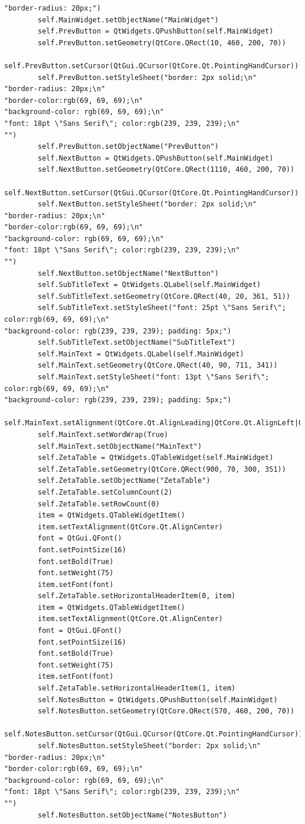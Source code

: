 \documentclass{article}
\begin{document}
\begin{lstlisting}
"border-radius: 20px;")
        self.MainWidget.setObjectName("MainWidget")
        self.PrevButton = QtWidgets.QPushButton(self.MainWidget)
        self.PrevButton.setGeometry(QtCore.QRect(10, 460, 200, 70))
        self.PrevButton.setCursor(QtGui.QCursor(QtCore.Qt.PointingHandCursor))
        self.PrevButton.setStyleSheet("border: 2px solid;\n"
"border-radius: 20px;\n"
"border-color:rgb(69, 69, 69);\n"
"background-color: rgb(69, 69, 69);\n"
"font: 18pt \"Sans Serif\"; color:rgb(239, 239, 239);\n"
"")
        self.PrevButton.setObjectName("PrevButton")
        self.NextButton = QtWidgets.QPushButton(self.MainWidget)
        self.NextButton.setGeometry(QtCore.QRect(1110, 460, 200, 70))
        self.NextButton.setCursor(QtGui.QCursor(QtCore.Qt.PointingHandCursor))
        self.NextButton.setStyleSheet("border: 2px solid;\n"
"border-radius: 20px;\n"
"border-color:rgb(69, 69, 69);\n"
"background-color: rgb(69, 69, 69);\n"
"font: 18pt \"Sans Serif\"; color:rgb(239, 239, 239);\n"
"")
        self.NextButton.setObjectName("NextButton")
        self.SubTitleText = QtWidgets.QLabel(self.MainWidget)
        self.SubTitleText.setGeometry(QtCore.QRect(40, 20, 361, 51))
        self.SubTitleText.setStyleSheet("font: 25pt \"Sans Serif\"; color:rgb(69, 69, 69);\n"
"background-color: rgb(239, 239, 239); padding: 5px;")
        self.SubTitleText.setObjectName("SubTitleText")
        self.MainText = QtWidgets.QLabel(self.MainWidget)
        self.MainText.setGeometry(QtCore.QRect(40, 90, 711, 341))
        self.MainText.setStyleSheet("font: 13pt \"Sans Serif\"; color:rgb(69, 69, 69);\n"
"background-color: rgb(239, 239, 239); padding: 5px;")
        self.MainText.setAlignment(QtCore.Qt.AlignLeading|QtCore.Qt.AlignLeft|QtCore.Qt.AlignTop)
        self.MainText.setWordWrap(True)
        self.MainText.setObjectName("MainText")
        self.ZetaTable = QtWidgets.QTableWidget(self.MainWidget)
        self.ZetaTable.setGeometry(QtCore.QRect(900, 70, 300, 351))
        self.ZetaTable.setObjectName("ZetaTable")
        self.ZetaTable.setColumnCount(2)
        self.ZetaTable.setRowCount(0)
        item = QtWidgets.QTableWidgetItem()
        item.setTextAlignment(QtCore.Qt.AlignCenter)
        font = QtGui.QFont()
        font.setPointSize(16)
        font.setBold(True)
        font.setWeight(75)
        item.setFont(font)
        self.ZetaTable.setHorizontalHeaderItem(0, item)
        item = QtWidgets.QTableWidgetItem()
        item.setTextAlignment(QtCore.Qt.AlignCenter)
        font = QtGui.QFont()
        font.setPointSize(16)
        font.setBold(True)
        font.setWeight(75)
        item.setFont(font)
        self.ZetaTable.setHorizontalHeaderItem(1, item)
        self.NotesButton = QtWidgets.QPushButton(self.MainWidget)
        self.NotesButton.setGeometry(QtCore.QRect(570, 460, 200, 70))
        self.NotesButton.setCursor(QtGui.QCursor(QtCore.Qt.PointingHandCursor))
        self.NotesButton.setStyleSheet("border: 2px solid;\n"
"border-radius: 20px;\n"
"border-color:rgb(69, 69, 69);\n"
"background-color: rgb(69, 69, 69);\n"
"font: 18pt \"Sans Serif\"; color:rgb(239, 239, 239);\n"
"")
        self.NotesButton.setObjectName("NotesButton")


\end{lstlisting}
\end{document}
